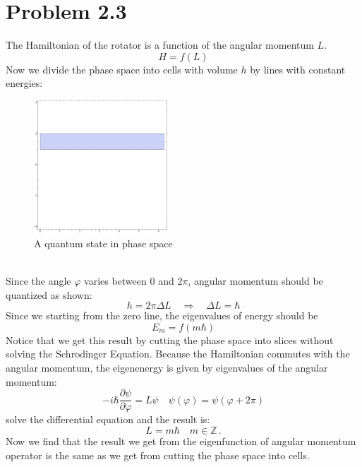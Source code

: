 \documentclass{article}
\begin{document}
\section*{Problem 2.3}
The Hamiltonian of the rotator is a function of the angular momentum $L$. 
$$
H = f(L)
$$
Now we divide the phase space into cells with volume $h$ by lines with constant energies:
\begin{figure}[!htp]
\centering
\includegraphics[width=5cm]{./figures/2.3-2.5/pic2.pdf}
\caption{A quantum state in phase space}
\end{figure}\\
Since the angle $\varphi$ varies between $0$ and $2\pi$, angular momentum should be quantized as shown:
$$
h = 2\pi\Delta L\quad \Rightarrow \quad \Delta L =\hbar
$$
Since we starting from the zero line, the eigenvalues of energy should be
\begin{equation}
E_m = f(m\hbar)
\end{equation}
Notice that we get this result by cutting the phase space into slices without solving the Schr$\ddot{\mathrm{o}}$dinger Equation. Because the Hamiltonian commutes with the angular momentum, the eigenenergy is given by eigenvalues of the angular momentum:
$$
-i\hbar \frac{\partial \psi}{\partial\varphi} = L\psi\quad\psi(\varphi) =\psi(\varphi+2\pi)
$$
solve the differential equation and the result is:
$$
L = m\hbar\quad m \in \mathbb{Z}\,.
$$
Now we find that the result we get from the eigenfunction of angular momentum operator is the same as we get from cutting the phase space into cells.
\end{document}
